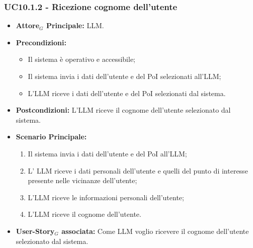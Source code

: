 \documentclass[11pt]{article}
\begin{document}
\begin{justify}
\subsubsection{\textbf{UC10.1.2 - Ricezione cognome dell'utente}}
\begin{itemize}
    \item \textbf{Attore$_G$ Principale:} LLM.
    \item \textbf{Precondizioni:} 
        \begin{itemize}
          \item Il sistema è operativo e accessibile;
          \item Il sistema invia i dati dell'utente e del PoI selezionati all'LLM;
            \item L'LLM riceve i dati dell'utente e del PoI selezionati dal sistema.
        \end{itemize}
      \item \textbf{Postcondizioni:} L'LLM riceve il cognome dell'utente selezionato dal sistema.
    \item \textbf{Scenario Principale:} 
        \begin{enumerate}
          \item Il sistema invia i dati dell'utente e del PoI all'LLM;
        \item L' LLM riceve i dati personali dell'utente e quelli del punto di interesse presente nelle vicinanze dell'utente;
          \item L'LLM riceve le informazioni personali dell'utente;
          \item L'LLM riceve il cognome dell'utente.
        \end{enumerate}
      \item \textbf{User-Story$_G$ associata:} Come LLM voglio ricevere il cognome dell'utente selezionato dal sistema.
\end{itemize}

\end{justify}
\end{document}
